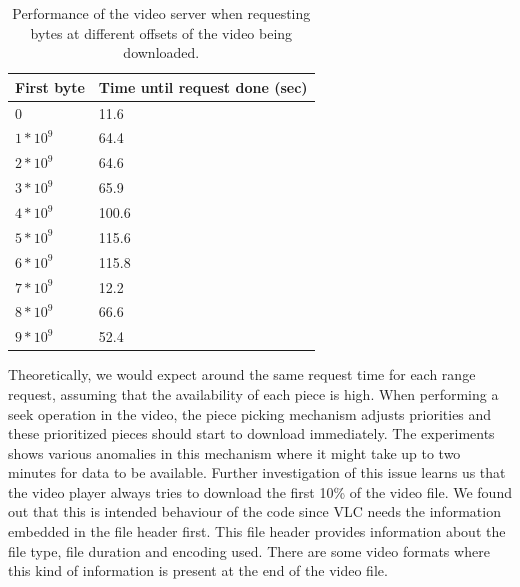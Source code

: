 \begin{table}[]
	\centering
	\begin{tabular}{|l|l|}
		\hline
		First byte               & Time until request done (sec) \\ \hline
		0                        & 11.6                  \\ \hline
		$ 1 * 10^9 $ & 64.4                  \\ \hline
		$ 2 * 10^9 $ & 64.6                  \\ \hline
		$ 3 * 10^9 $ & 65.9                   \\ \hline
		$ 4 * 10^9 $ & 100.6                   \\ \hline
		$ 5 * 10^9 $ & 115.6                   \\ \hline
		$ 6 * 10^9 $ & 115.8                  \\ \hline
		$ 7 * 10^9 $ & 12.2                  \\ \hline
		$ 8 * 10^9 $ & 66.6                   \\ \hline
		$ 9 * 10^9 $ & 52.4                   \\ \hline
	\end{tabular}
	\caption{Performance of the video server when requesting bytes at different offsets of the video being downloaded.}
	\label{table:video_player_seek_times}
\end{table}

Theoretically, we would expect around the same request time for each range request, assuming that the availability of each piece is high. When performing a seek operation in the video, the piece picking mechanism adjusts priorities and these prioritized pieces should start to download immediately. The experiments shows various anomalies in this mechanism where it might take up to two minutes for data to be available. Further investigation of this issue learns us that the video player always tries to download the first 10\% of the video file. We found out that this is intended behaviour of the code since VLC needs the information embedded in the file header first. This file header provides information about the file type, file duration and encoding used. There are some video formats where this kind of information is present at the end of the video file.\\\\

